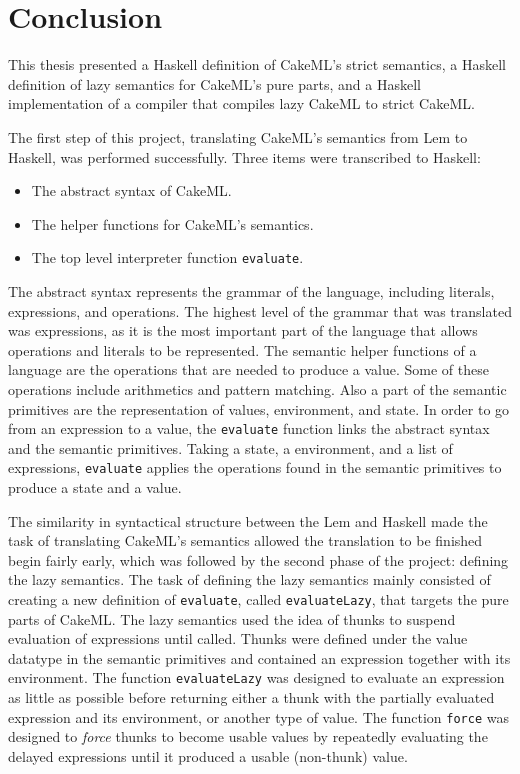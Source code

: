 \chapter{Conclusion}
This thesis presented a Haskell definition of CakeML's strict semantics,
a Haskell definition of lazy semantics for CakeML's pure parts, and a Haskell
implementation of a compiler that compiles lazy CakeML to strict CakeML.

The first step of this project, translating CakeML's semantics from Lem to
Haskell, was performed successfully. Three items were transcribed to Haskell:

\begin{itemize}
\item The abstract syntax of CakeML.
\item The helper functions for CakeML's semantics.
\item The top level interpreter function \texttt{evaluate}.
\end{itemize}
The abstract syntax represents the grammar of the language, including literals,
expressions, and operations. The highest level of the grammar that was
translated was expressions, as it is the most important part of the language
that allows operations and literals to be represented.
The semantic helper functions of a language are the operations that are needed
to produce a value. Some of these operations include arithmetics and
pattern matching. Also a part of the semantic primitives are the representation
of values, environment, and state.
In order to go from an expression to a value, the \texttt{evaluate} function
links the abstract syntax and the semantic primitives. Taking a state,
a environment, and a list of expressions, \texttt{evaluate} applies the
operations found in the semantic primitives to produce a state and a value.

The similarity in syntactical structure between the Lem and Haskell made the
task of translating CakeML's semantics allowed the translation to be finished
begin fairly early, which was followed by the second phase of the project:
defining the lazy semantics. The task of defining the lazy semantics mainly
consisted of creating a new definition of \texttt{evaluate}, called
\texttt{evaluateLazy}, that targets the pure parts of CakeML.
The lazy semantics used the idea of thunks to suspend
evaluation of expressions until called. Thunks were defined under the value
datatype in the semantic primitives and contained an expression together with
its environment. The function \texttt{evaluateLazy} was designed to evaluate an
expression as little as possible before returning either a thunk with the
partially evaluated expression and its environment, or another type of value.
The function \texttt{force} was designed to \textit{force} thunks to become
usable values by repeatedly evaluating the delayed expressions until it produced
a usable (non-thunk) value.

